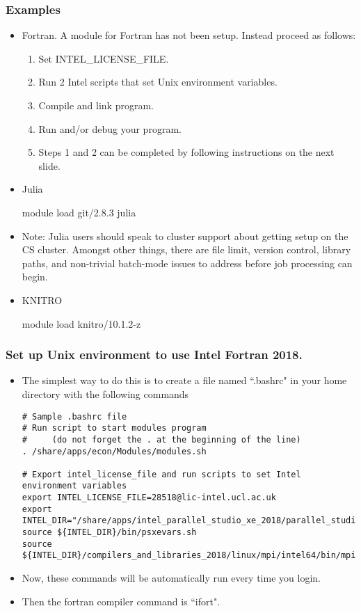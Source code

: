 \documentclass{beamer}
\begin{document}
\begin{frame}
\frametitle{Examples}
\begin{itemize}
\item Fortran. A module for Fortran has not been setup. Instead proceed as follows: \vspace{0.2cm}
\begin{enumerate}
\item Set INTEL\_LICENSE\_FILE.
\item Run 2 Intel scripts that set Unix environment variables.
\item Compile and link program.
\item Run and/or debug your program.
\item Steps 1 and 2 can be completed by following instructions on the next slide.
\end{enumerate}
\item Julia
\vspace{0.2cm}
\begin{semiverbatim}
module load git/2.8.3 julia
\end{semiverbatim}
\item Note: Julia users should speak to cluster support about getting setup on the CS cluster. Amongst other things, there are file limit, version control, library paths, and non-trivial batch-mode issues to address before job processing can begin.
\item KNITRO
\vspace{0.2cm}
\begin{semiverbatim}
module load knitro/10.1.2-z
\end{semiverbatim}
\end{itemize}
\end{frame}

\begin{frame}[fragile]
\frametitle{Set up Unix environment to use Intel Fortran 2018.}

\begin{itemize}
\item The simplest way to do this is to create a file named ``.bashrc" in your home directory with the following commands
\begin{tiny}
\begin{Verbatim}
# Sample .bashrc file
# Run script to start modules program
#     (do not forget the . at the beginning of the line) 
. /share/apps/econ/Modules/modules.sh

# Export intel_license_file and run scripts to set Intel environment variables
export INTEL_LICENSE_FILE=28518@lic-intel.ucl.ac.uk
export INTEL_DIR="/share/apps/intel_parallel_studio_xe_2018/parallel_studio_xe_2018.3.051"
source ${INTEL_DIR}/bin/psxevars.sh
source ${INTEL_DIR}/compilers_and_libraries_2018/linux/mpi/intel64/bin/mpivars.sh
\end{Verbatim}
\end{tiny}
\item Now, these commands will be automatically run every time you login.
\item Then the fortran compiler command is ``ifort".
\end{itemize}
\end{frame}
\end{document}
